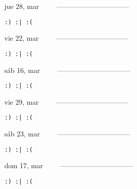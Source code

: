 \documentclass[letterpaper,10pt]{article}
\begin{document}
\begin{multicols}{3}
{jue 28, mar\ \ \ \ \ --------------------------------}
\begin{flushright}\begin{small}\texttt{:) :| :(}\end{small}\end{flushright}
\vfill
{vie 22, mar\ \ \ \ \ --------------------------------}
\begin{flushright}\begin{small}\texttt{:) :| :(}\end{small}\end{flushright}\par
\vfill
{sáb 16, mar\ \ \ \ \ --------------------------------}
\begin{flushright}\begin{small}\texttt{:) :| :(}\end{small}\end{flushright}\par
\vfill
\end{multicols}
\vspace{1.05cm}

\begin{multicols}{3}
{vie 29, mar\ \ \ \ \ --------------------------------}
\begin{flushright}\begin{small}\texttt{:) :| :(}\end{small}\end{flushright}
\vfill
{sáb 23, mar\ \ \ \ \ --------------------------------}
\begin{flushright}\begin{small}\texttt{:) :| :(}\end{small}\end{flushright}\par
\vfill
{dom 17, mar\ \ \ \ \ --------------------------------}
\begin{flushright}\begin{small}\texttt{:) :| :(}\end{small}\end{flushright}\par
\vfill
\end{multicols}
\vspace{1.05cm}
\end{document}
